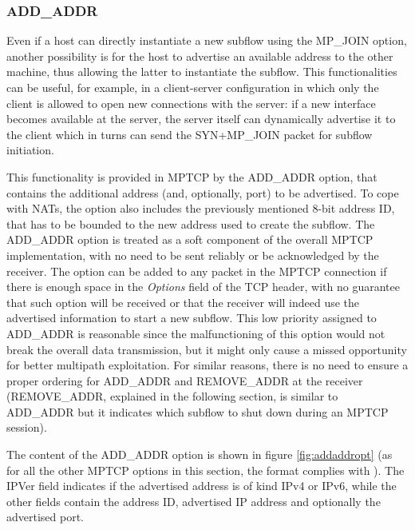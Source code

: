 
\subsubsection{ADD\_ADDR}
Even if a host can directly instantiate a new subflow using the MP\_JOIN option, another possibility is for the host to advertise an available address to the other machine, thus allowing the latter to instantiate the subflow.
This functionalities can be useful, for example, in a client-server configuration in which only the client is allowed to open new connections with the server: if a new interface becomes available at the server, the server itself can dynamically advertise it to the client which in turns can send the SYN+MP\_JOIN packet for subflow initiation.

This functionality is provided in MPTCP by the ADD\_ADDR option, that contains the additional address (and, optionally, port) to be advertised. To cope with NATs, the option also includes the previously mentioned 8-bit address ID, that has to be bounded to the new address used to create the subflow.
The ADD\_ADDR option is treated as a soft component of the overall MPTCP implementation, with no need to be sent reliably or be acknowledged by the receiver. The option can be added to any packet in the MPTCP connection if there is enough space in the \textit{Options} field of the TCP header, with no guarantee that such option will be received or that the receiver will indeed use the advertised information to start a new subflow. This low priority assigned to ADD\_ADDR is reasonable since the malfunctioning of this option would not break the overall data transmission, but it might only cause a missed opportunity for better multipath exploitation. For similar reasons, there is no need to ensure a proper ordering for ADD\_ADDR and REMOVE\_ADDR at the receiver (REMOVE\_ADDR, explained in the following section, is similar to ADD\_ADDR but it indicates which subflow to shut down during an MPTCP session). 

The content of the ADD\_ADDR option is shown in figure \ref{fig:addaddropt} (as for all the other MPTCP options in this section, the format complies with ). The IPVer field indicates if the advertised address is of kind IPv4 or IPv6, while the other fields contain the address ID, advertised IP address and optionally the advertised port.

